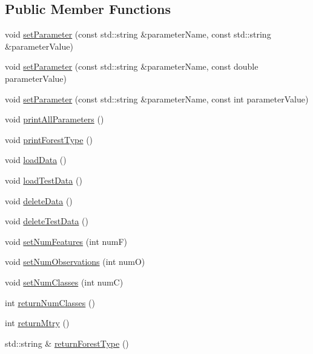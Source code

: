 \subsection*{Public Member Functions}
\begin{DoxyCompactItemize}
\item 
void \hyperlink{classfp_1_1fpSingleton_a90f275b256694ea7b16577d547a33044}{set\+Parameter} (const std\+::string \&parameter\+Name, const std\+::string \&parameter\+Value)
\item 
void \hyperlink{classfp_1_1fpSingleton_a19dd80e98acb4dd3e82be5e744840d1f}{set\+Parameter} (const std\+::string \&parameter\+Name, const double parameter\+Value)
\item 
void \hyperlink{classfp_1_1fpSingleton_a3465c3ff9376fae2933d9267c32761ca}{set\+Parameter} (const std\+::string \&parameter\+Name, const int parameter\+Value)
\item 
void \hyperlink{classfp_1_1fpSingleton_a0d769b6652e4c74c2734cdc811eeab5a}{print\+All\+Parameters} ()
\item 
void \hyperlink{classfp_1_1fpSingleton_ad9696336521f72c7c6a021608799871e}{print\+Forest\+Type} ()
\item 
void \hyperlink{classfp_1_1fpSingleton_a86042ae6be6f59dfb90232678350011a}{load\+Data} ()
\item 
void \hyperlink{classfp_1_1fpSingleton_aea7c3b65ded387322d7d5ce48ab96215}{load\+Test\+Data} ()
\item 
void \hyperlink{classfp_1_1fpSingleton_a204b85f9d08ca711ca6620b5e020cc1c}{delete\+Data} ()
\item 
void \hyperlink{classfp_1_1fpSingleton_aa4ac02c580b06ba16ed0160ec694438d}{delete\+Test\+Data} ()
\item 
void \hyperlink{classfp_1_1fpSingleton_a5a35867349f6d172f77af7026fdaecbe}{set\+Num\+Features} (int numF)
\item 
void \hyperlink{classfp_1_1fpSingleton_acf821a8fda9d3296cde7dc33b9c1ddb5}{set\+Num\+Observations} (int numO)
\item 
void \hyperlink{classfp_1_1fpSingleton_a499e7cef6b463cc24590d05a0d0e6e1c}{set\+Num\+Classes} (int numC)
\item 
int \hyperlink{classfp_1_1fpSingleton_a5602580110329a6b25602b1789e4e2c2}{return\+Num\+Classes} ()
\item 
int \hyperlink{classfp_1_1fpSingleton_a45ae68ceb91880ddbc0e049a47c371eb}{return\+Mtry} ()
\item 
std\+::string \& \hyperlink{classfp_1_1fpSingleton_af7582b20b48b7eb8c0a6b89fbdf170ab}{return\+Forest\+Type} ()

\end{DoxyCompactItemize}

